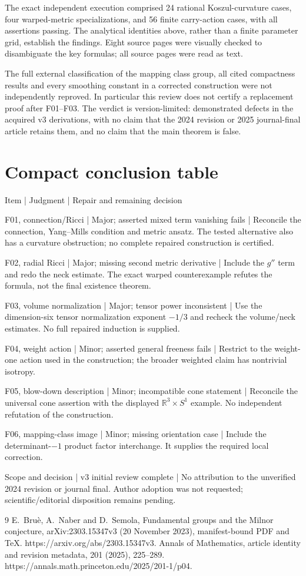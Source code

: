 \documentclass[10pt]{article}
\begin{document}
The exact independent execution comprised 24 rational Koszul-curvature cases, four warped-metric specializations, and 56 finite carry-action cases, with all assertions passing. The analytical identities above, rather than a finite parameter grid, establish the findings. Eight source pages were visually checked to disambiguate the key formulas; all source pages were read as text.\par
The full external classification of the mapping class group, all cited compactness results and every smoothing constant in a corrected construction were not independently reproved. In particular this review does not certify a replacement proof after F01–F03. The verdict is version-limited: demonstrated defects in the acquired v3 derivations, with no claim that the 2024 revision or 2025 journal-final article retains them, and no claim that the main theorem is false.\par
\section*{Compact conclusion table}
Item | Judgment | Repair and remaining decision\par
F01, connection/Ricci | Major; asserted mixed term vanishing fails | Reconcile the connection, Yang–Mills condition and metric ansatz. The tested alternative also has a curvature obstruction; no complete repaired construction is certified.\par
F02, radial Ricci | Major; missing second metric derivative | Include the \(g''\) term and redo the neck estimate. The exact warped counterexample refutes the formula, not the final existence theorem.\par
F03, volume normalization | Major; tensor power inconsistent | Use the dimension-six tensor normalization exponent \(-1/3\) and recheck the volume/neck estimates. No full repaired induction is supplied.\par
F04, weight action | Minor; asserted general freeness fails | Restrict to the weight-one action used in the construction; the broader weighted claim has nontrivial isotropy.\par
F05, blow-down description | Minor; incompatible cone statement | Reconcile the universal cone assertion with the displayed \(\mathbb R^3\times S^1\) example. No independent refutation of the construction.\par
F06, mapping-class image | Minor; missing orientation case | Include the determinant-\(-1\) product factor interchange. It supplies the required local correction.\par
Scope and decision | v3 initial review complete | No attribution to the unverified 2024 revision or journal final. Author adoption was not requested; scientific/editorial disposition remains pending.\par
9 E. Bruè, A. Naber and D. Semola, Fundamental groups and the Milnor conjecture, arXiv:2303.15347v3 (20 November 2023), manifest-bound PDF and TeX. https://arxiv.org/abs/2303.15347v3. Annals of Mathematics, article identity and revision metadata, 201 (2025), 225–289. https://annals.math.princeton.edu/2025/201-1/p04.\par
\end{document}
